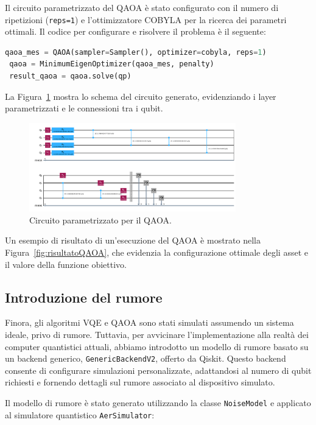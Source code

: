 Il circuito parametrizzato del QAOA è stato configurato con il numero di ripetizioni 
(\texttt{reps=1}) e l'ottimizzatore COBYLA per la ricerca dei parametri ottimali. 
Il codice per configurare e risolvere il problema è il seguente:

\begin{lstlisting}[language=python]
 qaoa_mes = QAOA(sampler=Sampler(), optimizer=cobyla, reps=1)
 qaoa = MinimumEigenOptimizer(qaoa_mes, penalty)
 result_qaoa = qaoa.solve(qp)
\end{lstlisting}

La Figura~\ref{fig:qaoa_circuit} mostra lo schema del circuito generato, evidenziando 
i layer parametrizzati e le connessioni tra i qubit.

\begin{figure}[h!]
    \centering
    \includegraphics[width=0.8\textwidth]{images/circuitoQAOA.png}
    \caption{Circuito parametrizzato per il QAOA.}
    \label{fig:qaoa_circuit}
\end{figure}

Un esempio di risultato di un'esecuzione del QAOA è mostrato nella 
Figura~\ref{fig:risultatoQAOA}, che evidenzia la configurazione ottimale degli asset 
e il valore della funzione obiettivo.



\subsection{Introduzione del rumore}

Finora, gli algoritmi VQE e QAOA sono stati simulati assumendo un sistema ideale, 
privo di rumore. Tuttavia, per avvicinare l'implementazione alla realtà dei computer 
quantistici attuali, abbiamo introdotto un modello di rumore basato su un backend 
generico, \texttt{GenericBackendV2}, offerto da Qiskit. Questo backend consente 
di configurare simulazioni personalizzate, adattandosi al numero di qubit richiesti 
e fornendo dettagli sul rumore associato al dispositivo simulato.

Il modello di rumore è stato generato utilizzando la classe \texttt{NoiseModel} 
e applicato al simulatore quantistico \texttt{AerSimulator}:

